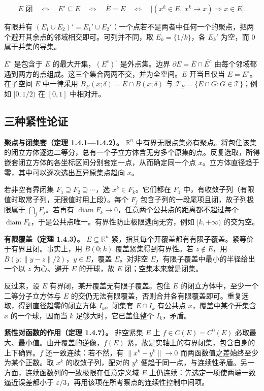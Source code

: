 \documentclass[11pt,a4paper]{article}
\begin{document}
\[
E\text{ 闭}\quad\Longleftrightarrow\quad E'\subseteq E
\quad\Longleftrightarrow\quad \overline E=E
\quad\Longleftrightarrow\quad
\big[(x^k\in E,\ x^k\to x)\Longrightarrow x\in E\big].
\]

有限并有 \((E_1\cup E_2)'=E_1'\cup E_2'\)：一个点若不是两者中任何一个的聚点，把两个避开其余点的邻域相交即可。可列并不同，取 \(E_k=\{1/k\}\)，各 \(E_k'\) 为空，而 \(0\) 属于并集的导集。

\(E^\circ\) 是包含于 \(E\) 的最大开集，\((E^c)^\circ\) 是外点集。边界 \(\partial E=\overline E\cap\overline{E^c}\) 由每个邻域都遇到两方的点组成。这三个集合两两不交，并为全空间。\(E\) 开当且仅当 \(E=E^\circ\)。在子空间 \(E\) 中一律采用 \(B_E(x;\delta)=E\cap B(x;\delta)\) 与 \(\mathcal T_E=\{E\cap G:G\in\mathcal T\}\)；例如 \([0,1/2)\) 在 \([0,1]\) 中相对开。

\subsection{三种紧性论证}

\textbf{聚点与闭集套（定理 1.4.1---1.4.2）。} \(\mathbb R^n\) 中有界无限点集必有聚点。将包住该集的闭立方体逐边二等分，总有一个子立方体含无穷多个原集的点。反复选取，所得嵌套闭立方体的各坐标区间分别套定一点，从而确定同一个点 \(x\)。立方体直径趋于零，其中可以逐次选出互异原集点趋向 \(x\)。

若非空有界闭集 \(F_1\supseteq F_2\supseteq\cdots\)，选 \(x^k\in F_k\)。它们都在 \(F_1\) 中，有收敛子列（有限值时取常子列，无限值时用上段）。每个 \(F_j\) 包含子列的一段尾项且闭，故子列极限属于 \(\bigcap_j F_j\)。若再有 \(\operatorname{diam}F_k\to0\)，任意两个公共点的距离都不超过每个 \(\operatorname{diam}F_k\)，于是公共点唯一。有界性防止极限逃向无穷，例如 \([k,+\infty)\) 的交为空。

\textbf{有限覆盖（定理 1.4.3）。} \(E\subseteq\mathbb R^n\) 紧，指其每个开覆盖都有有限子覆盖。紧等价于有界且闭。事实上，用 \(B(0;k)\) 覆盖紧集得到有界性。若 \(z\notin E\)，用 \(B(y;\|y-z\|/2)\)，\(y\in E\)，覆盖 \(E\)。对非空 \(E\)，有限子覆盖中最小的半径给出一个以 \(z\) 为心、避开 \(E\) 的开球，故 \(E\) 闭；空集本来就是闭集。

反过来，设 \(E\) 有界闭，某开覆盖无有限子覆盖。包住 \(E\) 的闭立方体中，至少一个二等分子立方体与 \(E\) 的交仍无法有限覆盖，否则合并各有限覆盖即可。重复选取，得到直径趋零的闭立方体 \(I_k\)。闭集套 \(E\cap I_k\) 有公共点 \(x\)，覆盖中某个开集含 \(x\) 的一个球，因而当 \(k\) 足够大时，它已盖住整个 \(I_k\)，矛盾。

\textbf{紧性对函数的作用（定理 1.4.7）。} 非空紧集 \(E\) 上 \(f\in C(E)=C^0(E)\) 必取最大、最小值。由开覆盖的逆像，\(f(E)\) 紧，故是实轴上的有界闭集，包含自身的上下确界。\(f\) 还一致连续：若不然，有 \(\|x^k-y^k\|\to0\) 而两函数值之差始终至少为某个正数。取 \(x^k\) 的收敛子列，配对的 \(y^k\) 便趋于同一点，与连续性矛盾。另一方面，连续函数列的一致极限在任意定义域 \(E\) 上仍连续：先选定一项使两端一致逼近误差都小于 \(\varepsilon/3\)，再用该项在所考察点的连续性控制中间项。
\end{document}
